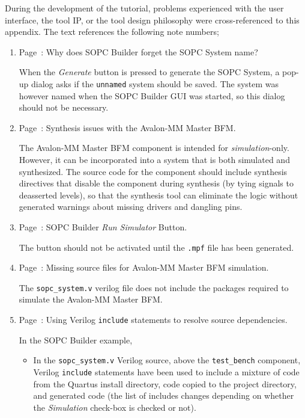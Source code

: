 \documentclass[10pt,twoside]{article}
\begin{document}
During the development of the tutorial, problems experienced with
the user interface, the tool IP, or the tool design philosophy
were cross-referenced to this appendix. The text references the
following note numbers;
%
\begin{enumerate}
%
\item Page~\pageref{bug:1}: Why does SOPC Builder forget the SOPC System name?

When the {\em Generate} button is pressed to generate the SOPC System,
a pop-up dialog asks if the \verb+unnamed+ system should be saved.
The system was however named when the SOPC Builder GUI was started,
so this dialog should not be necessary.

\item Page~\pageref{bug:2}: Synthesis issues with the Avalon-MM Master BFM.

The Avalon-MM Master BFM component is intended for {\em simulation}-only.
However, it can be incorporated into a system that is both simulated and
synthesized. The source code for the component should include synthesis
directives that disable the component during synthesis (by tying signals
to deasserted levels), so that the synthesis tool can eliminate the
logic without generated warnings about missing drivers and dangling pins.

\item Page~\pageref{bug:3}: SOPC Builder {\em Run Simulator} Button.

The button should not be activated until the \verb+.mpf+ file has been
generated.

\item Page~\pageref{bug:4}: Missing source files for Avalon-MM Master BFM simulation.

The \verb+sopc_system.v+ verilog file does not include the packages required
to simulate the Avalon-MM Master BFM.

\item Page~\pageref{bug:5}: 
Using Verilog \verb+include+ statements to resolve
source dependencies.

In the SOPC Builder example, 
%
\begin{itemize}
\item In the \verb+sopc_system.v+ Verilog source, above the
\verb+test_bench+ component, Verilog \verb+include+ statements have
been used to include a mixture of code from the Quartus install directory,
code copied to the project directory, and generated code
(the list of includes changes depending on whether the {\em Simulation}
check-box is checked or not).


\end{itemize}
\end{enumerate}
\end{document}
